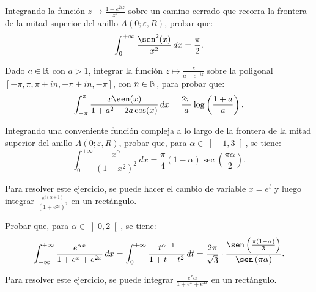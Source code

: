 \begin{ejercicio}
    Integrando la función $z \mapsto \frac{1-e^{2i z}}{z^2}$ sobre un camino cerrado que recorra la frontera de la mitad superior del anillo $A(0; \varepsilon, R)$, probar que:
    \begin{equation*}
        \int_0^{+\infty} \frac{\sen^2(x)}{x^2} \, dx = \frac{\pi}{2}.
    \end{equation*}
\end{ejercicio}

\begin{ejercicio}
    Dado $a \in \mathbb{R}$ con $a > 1$, integrar la función $z \mapsto \frac{z}{a - e^{-i z}}$ sobre la poligonal $\left[-\pi, \pi, \pi + i n, -\pi + i n, -\pi\right]$, con $n \in \mathbb{N}$, para probar que:
    \begin{equation*}
        \int_{-\pi}^{\pi} \frac{x\sen(x)}{1 + a^2 - 2a\cos(x)} \, dx = \frac{2\pi}{a}\log\left(\frac{1 + a}{a}\right).
    \end{equation*}
\end{ejercicio}

\begin{ejercicio}
    Integrando una conveniente función compleja a lo largo de la frontera de la mitad superior del anillo $A(0; \varepsilon, R)$, probar que, para $\alpha \in \left]-1, 3\right[$, se tiene:
    \begin{equation*}
        \int_0^{+\infty} \frac{x^\alpha}{(1 + x^2)^2} \, dx = \frac{\pi}{4}(1 - \alpha)\sec\left(\frac{\pi \alpha}{2}\right).
    \end{equation*}
    \begin{observacion}
        Para resolver este ejercicio, se puede hacer el cambio de variable $x = e^t$ y luego integrar $\frac{e^{t(\alpha + 1)}}{(1 + e^{2t})^2}$ en un rectángulo.
    \end{observacion}
\end{ejercicio}

\begin{ejercicio}
    Probar que, para $\alpha \in \left]0, 2\right[$, se tiene:
    \begin{equation*}
        \int_{-\infty}^{+\infty} \frac{e^{\alpha x}}{1 + e^x + e^{2x}} \, dx = \int_0^{+\infty} \frac{t^{\alpha - 1}}{1 + t + t^2} \, dt = \dfrac{2\pi}{\sqrt{3}}\cdot \dfrac{\sen\left(\frac{\pi(1 - \alpha)}{3}\right)}{\sen\left(\pi \alpha\right)}.
    \end{equation*}
    \begin{observacion}
        Para resolver este ejercicio, se puede integrar $\frac{e^x \alpha}{1 + e^x + e^{2x}}$ en un rectángulo.
    \end{observacion}
\end{ejercicio}

